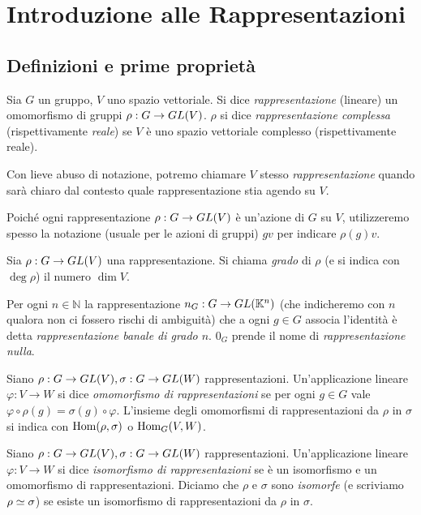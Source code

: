 \chapter{Introduzione alle Rappresentazioni}

\section{Definizioni e prime proprietà}

\begin{definition}
Sia $G$ un gruppo, $V$ uno spazio vettoriale. Si dice \emph{rappresentazione} (lineare) un omomorfismo di gruppi $\rho:G\to GL(V)$. $\rho$ si dice \emph{rappresentazione complessa} (rispettivamente \emph{reale}) se $V$ è uno spazio vettoriale complesso (rispettivamente reale).
\end{definition}

Con lieve abuso di notazione, potremo chiamare $V$ stesso \emph{rappresentazione} quando sarà chiaro dal contesto quale rappresentazione stia agendo su $V$.

Poiché ogni rappresentazione $\rho:G\to GL(V)$ è un'azione di $G$ su $V$, utilizzeremo spesso la notazione (usuale per le azioni di gruppi) $gv$ per indicare $\rho(g)v$.

\begin{definition}
Sia $\rho:G\to GL(V)$ una rappresentazione. Si chiama \emph{grado} di $\rho$ (e si indica con $\deg\rho$) il numero $\dim V$.
\end{definition}

\begin{example}
Per ogni $n\in\mathbb{N}$ la rappresentazione $n_G:G\to GL(\mathbb{K}^n)$ (che indicheremo con $n$ qualora non ci fossero rischi di ambiguità) che a ogni $g\in G$ associa l'identità è detta \emph{rappresentazione banale di grado $n$}. $0_G$ prende il nome di \emph{rappresentazione nulla}.
\end{example}

\begin{definition}
Siano $\rho:G\to GL(V),\allowbreak\sigma:G\to GL(W)$ rappresentazioni. Un'applicazione lineare $\varphi:V\to W$ si dice \emph{omomorfismo di rappresentazioni} se per ogni $g\in G$ vale $\varphi\circ\rho(g)=\sigma(g)\circ\varphi$. L'insieme degli omomorfismi di rappresentazioni da $\rho$ in $\sigma$ si indica con $\operatorname{Hom}(\rho,\sigma)$ o $\operatorname{Hom}_G(V, W)$.
\end{definition}

\begin{definition}
Siano $\rho:G\to GL(V),\allowbreak\sigma:G\to GL(W)$ rappresentazioni. Un'applicazione lineare $\varphi:V\to W$ si dice \emph{isomorfismo di rappresentazioni} se è un isomorfismo e un omomorfismo di rappresentazioni. Diciamo che $\rho$ e $\sigma$ sono \emph{isomorfe} (e scriviamo $\rho\simeq\sigma$) se esiste un isomorfismo di rappresentazioni da $\rho$ in $\sigma$.
\end{definition}

